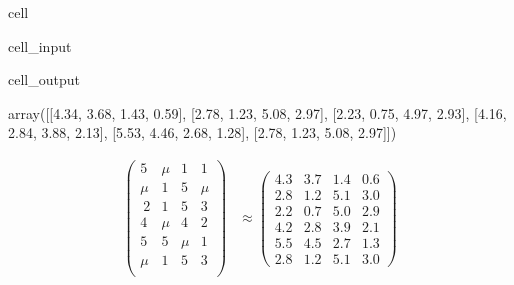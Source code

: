 \documentclass[letterpaper,10pt,english]{jupyterBook}
\begin{document}
\begin{sphinxuseclass}{cell}\begin{sphinxVerbatimInput}

\begin{sphinxuseclass}{cell_input}
\begin{sphinxVerbatim}[commandchars=\\\{\}]
\end{sphinxVerbatim}

\end{sphinxuseclass}\end{sphinxVerbatimInput}
\begin{sphinxVerbatimOutput}

\begin{sphinxuseclass}{cell_output}
\begin{sphinxVerbatim}[commandchars=\\\{\}]
array([[4.34, 3.68, 1.43, 0.59],
       [2.78, 1.23, 5.08, 2.97],
       [2.23, 0.75, 4.97, 2.93],
       [4.16, 2.84, 3.88, 2.13],
       [5.53, 4.46, 2.68, 1.28],
       [2.78, 1.23, 5.08, 2.97]])
\end{sphinxVerbatim}

\end{sphinxuseclass}\end{sphinxVerbatimOutput}

\end{sphinxuseclass}\label{equation:dim_reduction_mf:1e0e4300-e0a9-4567-9828-1bcd9c157c49}\begin{align}
  \begin{pmatrix}
    5 & \mu & 1 & 1 \\
    \mu & 1 & 5 & \mu  \\\
    2 & 1 & 5 & 3 \\
    4 & \mu & 4 & 2\\
    5 & 5 & \mu & 1 \\
    \mu & 1 & 5 & 3 \\
  \end{pmatrix}
  &\approx
  \begin{pmatrix}
    4.3 & 3.7 & 1.4 & 0.6\\
    2.8 & 1.2 & 5.1 & 3.0\\
    2.2 & 0.7 & 5.0 & 2.9\\
    4.2 & 2.8 & 3.9 & 2.1\\
    5.5 & 4.5 & 2.7 & 1.3\\
    2.8 & 1.2 & 5.1 & 3.0
  \end{pmatrix}
\end{align}
\end{document}
